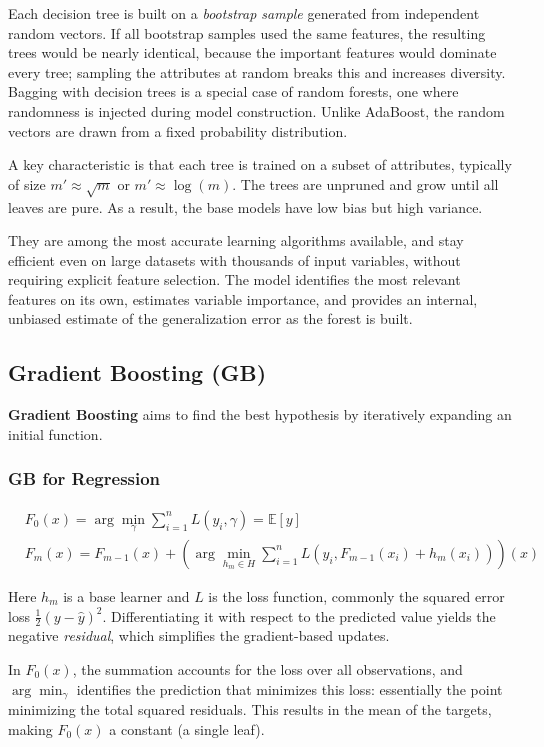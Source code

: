 Each decision tree is built on a \textit{bootstrap sample} generated from independent random vectors. If all bootstrap samples used the same features, the resulting trees would be nearly identical, because the important features would dominate every tree; sampling the attributes at random breaks this and increases diversity. Bagging with decision trees is a special case of random forests, one where randomness is injected during model construction. Unlike AdaBoost, the random vectors are drawn from a fixed probability distribution.

A key characteristic is that each tree is trained on a subset of attributes, typically of size $m' \approx \sqrt{m}$ or $m' \approx \log(m)$. The trees are unpruned and grow until all leaves are pure. As a result, the base models have low bias but high variance.

They are among the most accurate learning algorithms available, and stay efficient even on large datasets with thousands of input variables, without requiring explicit feature selection. The model identifies the most relevant features on its own, estimates variable importance, and provides an internal, unbiased estimate of the generalization error as the forest is built.

\subsection{Gradient Boosting (GB)}
\textbf{Gradient Boosting} aims to find the best hypothesis by iteratively expanding an initial function.
\subsubsection{GB for Regression}
\begin{align}
    &F_0(x) = \arg \min_{\gamma} \sum_{i=1}^n L(y_i, \gamma) = \mathbb{E}[y] \\
    &F_m(x) = F_{m-1}(x) + \left( \arg \min_{h_m \in H} \sum_{i=1}^n L(y_i, F_{m-1}(x_i) + h_m(x_i)) \right)(x)
\end{align}

Here $h_m$ is a base learner and $L$ is the loss function, commonly the squared error loss $\frac{1}{2}(y - \hat{y})^2$. Differentiating it with respect to the predicted value yields the negative \textit{residual}, which simplifies the gradient-based updates.

In $F_0(x)$, the summation accounts for the loss over all observations, and $\arg\min_\gamma$ identifies the prediction that minimizes this loss: essentially the point minimizing the total squared residuals. This results in the mean of the targets, making $F_0(x)$ a constant (a single leaf).

